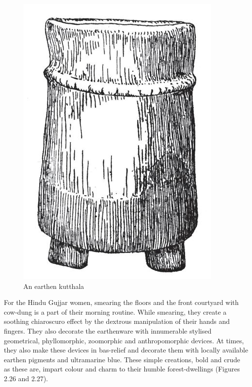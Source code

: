 \begin{figure}[!htbp]
\includegraphics[scale=.35]{images/chap02-25.jpg}
\caption{An earthen kutthala}\label{chap02-fig25}
\end{figure}

For the Hindu Gujjar women, smearing the floors and the front courtyard with cow-dung is a part of their morning routine. While smearing, they create a soothing chiaroscuro effect by the dextrous manipulation of their hands and fingers. They also decorate the earthenware with innumerable stylised geometrical, phyllomorphic, zoomorphic and anthropomorphic devices. At times, they also make these devices in bas-relief and decorate them with locally available earthen pigments and ultramarine blue. These simple creations, bold and crude as these are, impart colour and charm to their humble forest-dwellings (Figures 2.26 and 2.27).

